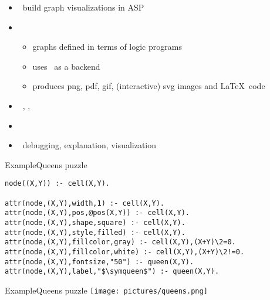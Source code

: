 \begin{frame}{\clingraph}
  \begin{itemize}
    \item {} \ build graph visualizations in ASP
    \item {}
      \begin{itemize}
      \item graphs defined in terms of logic programs %
      \item uses \graphviz\ as a backend
      \item produces png, pdf, gif, (interactive) svg images and \LaTeX\ code
      \end{itemize}
    \item {}   \ \clingo, \clorm, \graphviz
    \item {}   \ \cite{hasascst22a}
    \item {} \ debugging, explanation, visualization %
  \end{itemize}
\end{frame}
\begin{frame}[fragile]{Example}{Queens puzzle}
  \begin{adjustbox}{max totalsize={\textwidth}{.7\textheight},keepaspectratio}
    \begin{lstlisting}[mathescape]
node((X,Y)) :- cell(X,Y).

attr(node,(X,Y),width,1) :- cell(X,Y).
attr(node,(X,Y),pos,@pos(X,Y)) :- cell(X,Y).
attr(node,(X,Y),shape,square) :- cell(X,Y).
attr(node,(X,Y),style,filled) :- cell(X,Y).
attr(node,(X,Y),fillcolor,gray) :- cell(X,Y),(X+Y)\2=0.
attr(node,(X,Y),fillcolor,white) :- cell(X,Y),(X+Y)\2!=0.
attr(node,(X,Y),fontsize,"50") :- queen(X,Y).
attr(node,(X,Y),label,"$\symqueen$") :- queen(X,Y).
    \end{lstlisting}
  \end{adjustbox}
\end{frame}
\begin{frame}[c]{Example}{Queens puzzle}
  \qquad\texttt{[image: pictures/queens.png]}
\end{frame}
%
